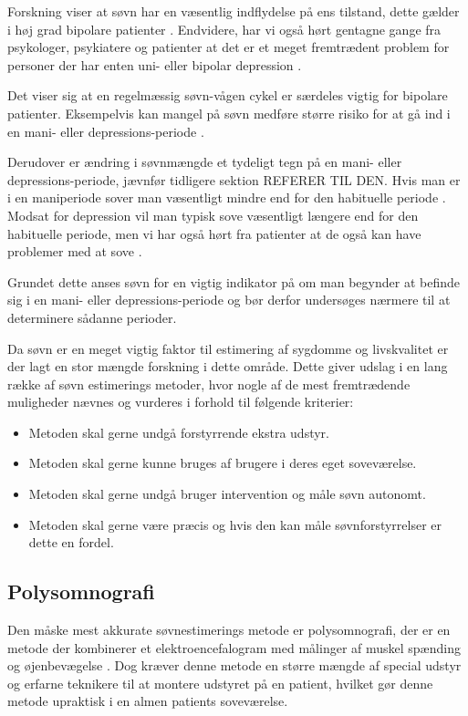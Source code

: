 Forskning viser at søvn har en væsentlig indflydelse på ens tilstand, dette gælder i høj grad bipolare patienter \citep{CPSP:CPSP1164}.
Endvidere, har vi også hørt gentagne gange fra psykologer, psykiatere og patienter at det er et meget fremtrædent problem for personer der har enten uni- eller bipolar depression \citep[Kapitel 2, Sektion 3,4,5]{misc:faellesrapp}.

Det viser sig at en regelmæssig søvn-vågen cykel er særdeles vigtig for bipolare patienter.
Eksempelvis kan mangel på søvn medføre større risiko for at gå ind i en mani- eller depressions-periode \citep{CPSP:CPSP1164}.

Derudover er ændring i søvnmængde et tydeligt tegn på en mani- eller depressions-periode, jævnfør tidligere sektion REFERER TIL DEN.
Hvis man er i en maniperiode sover man væsentligt mindre end for den habituelle periode \citep{CPSP:CPSP1164}.
Modsat for depression vil man typisk sove væsentligt længere end for den habituelle periode, men vi har også hørt fra patienter at de også kan have problemer med at sove \citep[Kapitel 2, Sektion 5]{misc:faellesrapp}.

Grundet dette anses søvn for en vigtig indikator på om man begynder at befinde sig i en mani- eller depressions-periode og bør derfor undersøges nærmere til at determinere sådanne perioder.

Da søvn er en meget vigtig faktor til estimering af sygdomme og livskvalitet er der lagt en stor mængde forskning i dette område.
Dette giver udslag i en lang række af søvn estimerings metoder, hvor nogle af de mest fremtrædende muligheder nævnes og vurderes i forhold til følgende kriterier:
\begin{itemize}
\item Metoden skal gerne undgå forstyrrende ekstra udstyr.
\item Metoden skal gerne kunne bruges af brugere i deres eget soveværelse.
\item Metoden skal gerne undgå bruger intervention og måle søvn autonomt.
\item Metoden skal gerne være præcis og hvis den kan måle søvnforstyrrelser er dette en fordel.
\end{itemize}

\subsection{Polysomnografi}
Den måske mest akkurate søvnestimerings metode er polysomnografi, der er en metode der kombinerer et elektroencefalogram med målinger af muskel spænding og øjenbevægelse \citep{misc:polysomnografi,misc:polysomnography}.
Dog kræver denne metode en større mængde af special udstyr og erfarne teknikere til at montere udstyret på en patient, hvilket gør denne metode upraktisk i en almen patients soveværelse.

